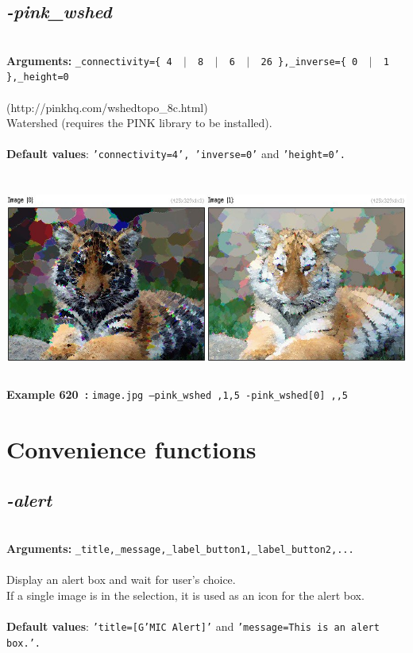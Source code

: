 \documentclass[a4paper,11pt,twoside]{book}
\begin{document}
\subsection{\emph{-pink\_wshed} }\vspace*{-0.5em}
~\\\textbf{Arguments: } 
{\small \texttt{\_connectivity=\{ 4 ~$|$~ 8 ~$|$~ 6 ~$|$~ 26 \},\_inverse=\{ 0 ~$|$~ 1 \},\_height=0}}\\~\\
(http://pinkhq.com/wshedtopo\_8c.html)
~\\Watershed (requires the PINK library to be installed).
~\\~\\\textbf{Default values}: {\small \texttt{'connectivity=4', 'inverse=0'} and \texttt{'height=0'.}}
\begin{center}\includegraphics[keepaspectratio=true,height=7cm,width=\textwidth]{img/gmic_def620.jpg}\\
{\footnotesize \textbf{Example 620~:} \texttt{image.jpg --pink\_wshed ,1,5 -pink\_wshed[0] ,,5}}
\end{center}
\section{Convenience functions}


\subsection{\emph{-alert} }\vspace*{-0.5em}
~\\\textbf{Arguments: } 
{\small \texttt{\_title,\_message,\_label\_button1,\_label\_button2,...}}\\~\\
Display an alert box and wait for user's choice.
~\\If a single image is in the selection, it is used as an icon for the alert box.
~\\~\\\textbf{Default values}: {\small \texttt{'title=[G'MIC Alert]'} and \texttt{'message=This is an alert box.'.}}
\end{document}

